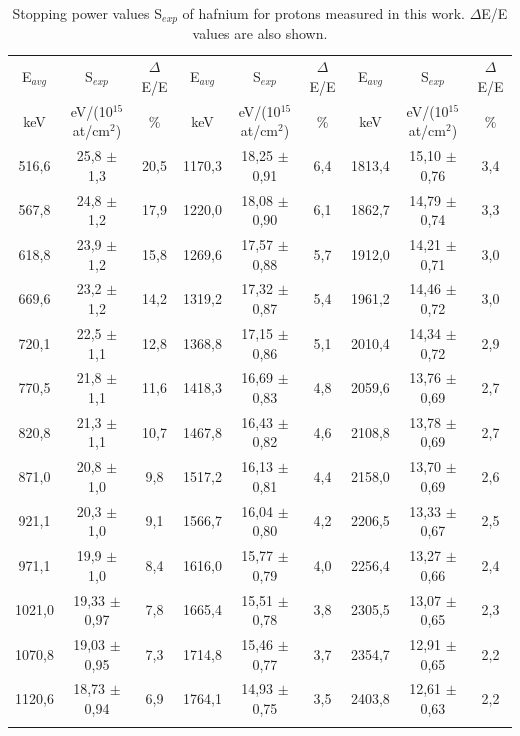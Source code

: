 \documentclass[aps,prb,reprint,groupedaddress]{revtex4-1}
\begin{document}
\begin{table}[!t]
\centering
\caption{Stopping power values S$_{exp}$ of hafnium for protons measured in this work. $\Delta$E/E values are also shown.
\label{table01}}

\vspace{0.2cm}

\begin{ruledtabular}
\begin{tabular}{ccc|ccc|ccc} %
E$_{avg}$	&S$_{exp}$			&$\Delta$E/E	&E$_{avg}$	&S$_{exp}$			&$\Delta$E/E	&E$_{avg}$	&S$_{exp}$			&$\Delta$E/E\\
keV		&eV/(10$^{15}$ at/cm$^2$)	&$\%$		&keV		&eV/(10$^{15}$ at/cm$^2$)	&$\%$		&keV		&eV/(10$^{15}$ at/cm$^2$)	&$\%$\\ \hline
516,6	&	25,8	$\pm$	1,3	&	20,5	&	1170,3	&	18,25	$\pm$	0,91	&	6,4	&	1813,4	&	15,10	$\pm$	0,76	&	3,4	\\
567,8	&	24,8	$\pm$	1,2	&	17,9	&	1220,0	&	18,08	$\pm$	0,90	&	6,1	&	1862,7	&	14,79	$\pm$	0,74	&	3,3	\\
618,8	&	23,9	$\pm$	1,2	&	15,8	&	1269,6	&	17,57	$\pm$	0,88	&	5,7	&	1912,0	&	14,21	$\pm$	0,71	&	3,0	\\
669,6	&	23,2	$\pm$	1,2	&	14,2	&	1319,2	&	17,32	$\pm$	0,87	&	5,4	&	1961,2	&	14,46	$\pm$	0,72	&	3,0	\\
720,1	&	22,5	$\pm$	1,1	&	12,8	&	1368,8	&	17,15	$\pm$	0,86	&	5,1	&	2010,4	&	14,34	$\pm$	0,72	&	2,9	\\
770,5	&	21,8	$\pm$	1,1	&	11,6	&	1418,3	&	16,69	$\pm$	0,83	&	4,8	&	2059,6	&	13,76	$\pm$	0,69	&	2,7	\\
820,8	&	21,3	$\pm$	1,1	&	10,7	&	1467,8	&	16,43	$\pm$	0,82	&	4,6	&	2108,8	&	13,78	$\pm$	0,69	&	2,7	\\
871,0	&	20,8	$\pm$	1,0	&	9,8	&	1517,2	&	16,13	$\pm$	0,81	&	4,4	&	2158,0	&	13,70	$\pm$	0,69	&	2,6	\\
921,1	&	20,3	$\pm$	1,0	&	9,1	&	1566,7	&	16,04	$\pm$	0,80	&	4,2	&	2206,5	&	13,33	$\pm$	0,67	&	2,5	\\
971,1	&	19,9	$\pm$	1,0	&	8,4	&	1616,0	&	15,77	$\pm$	0,79	&	4,0	&	2256,4	&	13,27	$\pm$	0,66	&	2,4	\\
1021,0	&	19,33	$\pm$	0,97	&	7,8	&	1665,4	&	15,51	$\pm$	0,78	&	3,8	&	2305,5	&	13,07	$\pm$	0,65	&	2,3	\\
1070,8	&	19,03	$\pm$	0,95	&	7,3	&	1714,8	&	15,46	$\pm$	0,77	&	3,7	&	2354,7	&	12,91	$\pm$	0,65	&	2,2	\\
1120,6	&	18,73	$\pm$	0,94	&	6,9	&	1764,1	&	14,93	$\pm$	0,75	&	3,5	&	2403,8	&	12,61	$\pm$	0,63	&	2,2	\\ \\ %
\end{tabular}
\end{ruledtabular}
\end{table}
\end{document}
